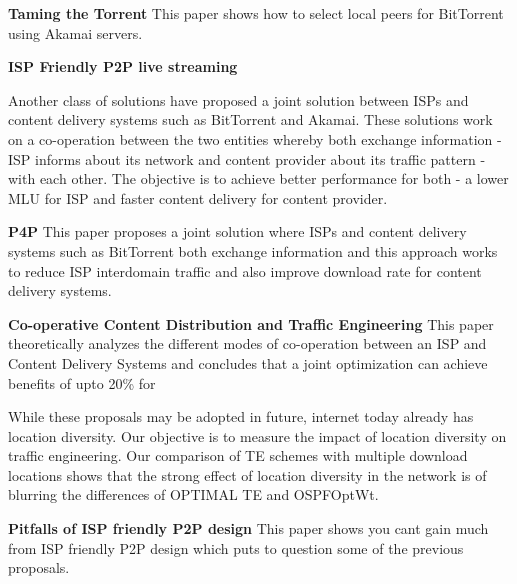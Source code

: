 \textbf{Taming the Torrent} This paper shows how to select local peers for BitTorrent using Akamai servers.

\textbf{ISP Friendly P2P live streaming} 

Another class of solutions have proposed a joint solution between ISPs and content delivery systems such as BitTorrent and Akamai. These solutions work on a co-operation between the two entities whereby both exchange information -  ISP informs about its network and content provider about its traffic pattern - with each other. The objective is to achieve better performance for both - a lower MLU for ISP and faster content delivery for content provider.

\textbf{P4P} This paper proposes a joint solution where ISPs and content delivery systems such as BitTorrent both exchange information and this approach works to reduce ISP interdomain traffic and also improve download rate for content delivery systems.

\textbf{Co-operative Content Distribution and Traffic Engineering} This paper theoretically analyzes the different modes of co-operation between an ISP and Content Delivery Systems and concludes that a joint optimization can achieve benefits of upto 20\% for 

While these proposals may be adopted in future, internet today already has location diversity. Our objective is to measure the impact of location diversity on traffic engineering. Our comparison of TE schemes with multiple download locations shows that the strong effect of location diversity in the network is of blurring the differences of OPTIMAL TE and OSPFOptWt.

\textbf{Pitfalls of ISP friendly P2P design} This paper shows you cant gain much from ISP friendly P2P design which puts to question some of the previous proposals.
